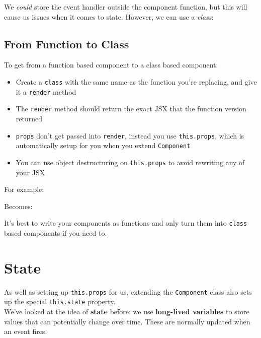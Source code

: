 We \textit{could} store the event handler outside the component function, but this will cause us issues when it comes to state. However, we can use a \textit{class}:



\subsection{From Function to Class}

To get from a function based component to a class based component:

\begin{itemize}
    \item Create a \texttt{class} with the same name as the function you're replacing, and give it a \texttt{render} method
    \item The \texttt{render} method should return the exact JSX that the function version returned
    \item \texttt{props} don't get passed into \texttt{render}, instead you use \texttt{this.props}, which is automatically setup for you when you extend \texttt{Component}
    \item You can use object destructuring on \texttt{this.props} to avoid rewriting any of your JSX
\end{itemize}

For example:


Becomes:


It's best to write your components as functions and only turn them into \texttt{class} based components if you need to.



\section{State}

As well as setting up \texttt{this.props} for us, extending the \texttt{Component} class also sets up the special \texttt{this.state} property.
\\

We've looked at the idea of \textbf{state} before: we use \textbf{long-lived variables} to store values that can potentially change over time. These are normally updated when an event fires.
\\

